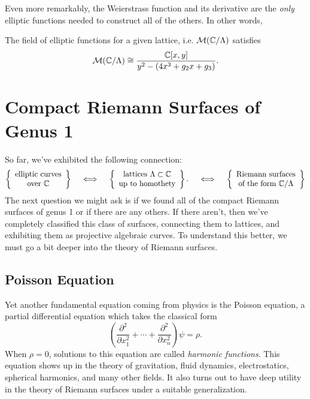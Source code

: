 \documentclass{lkx_paper}
\begin{document}
Even more remarkably, the Weierstrass function and its derivative are the \emph{only} elliptic functions needed to construct all of the others. In other words,
\begin{theorem}
	The field of elliptic functions for a given lattice, i.e. $\mathcal{M}(\mathbb{C}/\Lambda)$ satisfies
	\[
		\mathcal{M}(\mathbb{C}/\Lambda) \cong \frac{\mathbb{C}[x,y]}{y^2-(4x^3+g_2x+g_3)}.
	\]
\end{theorem}

\section{Compact Riemann Surfaces of Genus 1}

So far, we've exhibited the following connection:
\[
	\left\{\begin{array}{c}\textrm{elliptic curves}\\ \textrm{over } \mathbb{C}\end{array}\right\}
	\quad\iff\quad \left\{\begin{array}{c}
		\textrm{lattices }\Lambda\subset \mathbb{C} \\\textrm{up to homothety}
	\end{array}\right\}.
	\quad\iff\quad \left\{\begin{array}{c}
		\textrm{Riemann surfaces} \\\textrm{of the form }\mathbb{C}/\Lambda
	\end{array}\right\}
\]
The next question we might ask is if we found all of the compact Riemann surfaces of genus 1 or if there are any others. If there aren't, then we've completely classified this class of surfaces, connecting them to lattices, and exhibiting them as projective algebraic curves. To understand this better, we must go a bit deeper into the theory of Riemann surfaces.

\subsection{Poisson Equation}

Yet another fundamental equation coming from physics is the Poisson equation, a partial differential equation which takes the classical form
\[
	\left(\frac{\partial^2}{\partial x_1^2}+\cdots + \frac{\partial^2}{\partial x_n^2}\right)\psi = \rho.
\]
When $\rho=0$, solutions to this equation are called \emph{harmonic functions}. This equation shows up in the theory of gravitation, fluid dynamics, electrostatics, spherical harmonics, and many other fields. It also turns out to have deep utility in the theory of Riemann surfaces under a suitable generalization.
\end{document}
